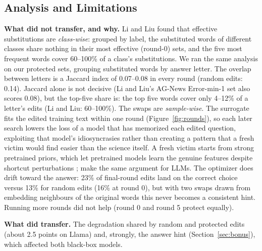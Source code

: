 \documentclass{article}
\begin{document}
\subsection{Analysis and Limitations}\label{sec:analysis}
\textbf{What did not transfer, and why.} Li and Liu found that effective substitutions are \emph{class-wise}: grouped by
label, the substituted words of different classes share nothing in their most effective (round-0) sets, and the five
most frequent words cover 60--100\% of a class's substitutions. We ran the same analysis on our protected sets, grouping
substituted words by answer letter. The overlap between letters is a Jaccard index of 0.07--0.08 in every round (random
edits: 0.14). Jaccard alone is not decisive (Li and Liu's AG-News Error-min-1 set also scores 0.08), but the top-five
share is: the top five words cover only 4--12\% of a letter's edits (Li and Liu: 60--100\%). The swaps are
\emph{sample-wise}. The surrogate fits the edited training text within one round (Figure~\ref{fig:rounds}), so each
later search lowers the loss of a model that has memorized each edited question, exploiting that model's idiosyncrasies
rather than creating a pattern that a fresh victim would find easier than the science itself. A fresh victim starts from
strong pretrained priors, which let pretrained models learn the genuine features despite shortcut perturbations
\citep{li2026priors}; \citet{zhao2026textcloak} make the same argument for LLMs. The optimizer does drift toward the answer: 23\% of
final-round edits land on the correct choice versus 13\% for random edits (16\% at round 0), but with two swaps drawn from
embedding neighbours of the original words this never becomes a consistent hint. Running more rounds did not help (round 0 and round 5
protect equally).

\textbf{What did transfer.} The degradation shared by random and protected edits (about 2.5 points on Llama) and,
strongly, the answer hint (Section~\ref{sec:bonus}), which affected both black-box models.
\end{document}
